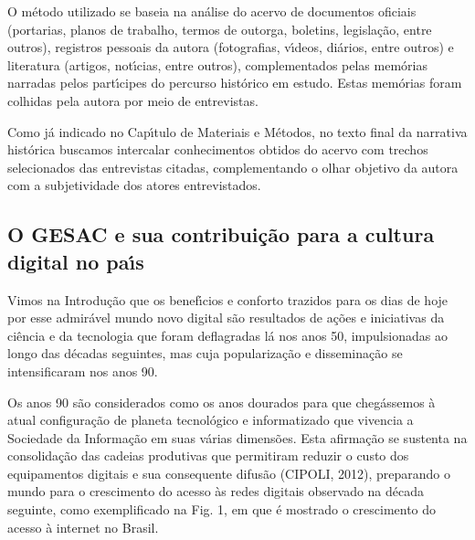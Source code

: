 \documentclass[
12pt,		%
openright,	%
twoside,  %
a4paper,			%
chapter=TITLE,		%
english,			%
french,				%
spanish,			%
brazil				%
]{USPSC-classe/USPSC}
\begin{document}
O m\'etodo utilizado se baseia na an\'alise do acervo de documentos oficiais (portarias, planos de trabalho, termos de outorga, boletins, legisla\c{c}\~ao, entre outros), registros pessoais da autora (fotografias, v\'{\i}deos, di\'arios, entre outros) e literatura (artigos, not\'{\i}cias, entre outros), complementados pelas mem\'orias narradas pelos part\'{\i}cipes do percurso hist\'orico em estudo. Estas mem\'orias foram colhidas pela autora por meio de entrevistas.








Como j\'a indicado no Cap\'{\i}tulo de Materiais e M\'etodos, no texto final da narrativa hist\'orica buscamos intercalar conhecimentos obtidos do acervo com trechos selecionados das entrevistas citadas, complementando o olhar objetivo da autora com a subjetividade dos atores entrevistados.








\subsection[O GESAC e sua contribui\c{c}\~ao para  a cultura  digital  no pa\'{\i}s]{O GESAC e sua contribui\c{c}\~ao para  a cultura  digital  no pa\'{\i}s}\label{O GESAC e sua contribui\c{c}\~ao para  a cultura  digital  no pa\'{\i}s}
Vimos na Introdu\c{c}\~ao que os benef\'{\i}cios e conforto trazidos para os dias de hoje por esse admir\'avel mundo novo digital s\~ao resultados de a\c{c}\~oes e iniciativas da ci\^encia e da tecnologia que foram deflagradas l\'a nos anos 50, impulsionadas ao longo das d\'ecadas seguintes, mas cuja populariza\c{c}\~ao e dissemina\c{c}\~ao se intensificaram nos anos 90.








Os anos 90 s\~ao considerados como os anos dourados para que cheg\'assemos \`a atual configura\c{c}\~ao de planeta tecnol\'ogico e informatizado que vivencia a Sociedade da Informa\c{c}\~ao em suas v\'arias dimens\~oes. Esta afirma\c{c}\~ao se sustenta na consolida\c{c}\~ao das cadeias produtivas que permitiram reduzir o custo dos equipamentos digitais e sua consequente difus\~ao  (CIPOLI, 2012), preparando o mundo para o crescimento do acesso \`as redes digitais observado na d\'ecada seguinte, como exemplificado na Fig. 1, em que \'e mostrado o crescimento do acesso \`a internet no Brasil.
\end{document}
